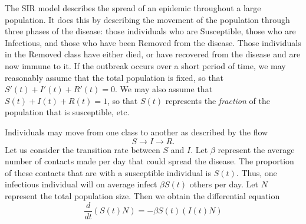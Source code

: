 %
%
%
%
%
%
%
%
The SIR model describes the spread of an epidemic throughout a large population.
It does this by describing the movement of the population through three phases of the disease: those individuals who are Susceptible, those who are Infectious, and those who have been Removed from the disease.
Those individuals in the Removed class have either died, or have recovered from the disease and are now immune to it.
If the outbreak occurs over a short period of time, we may reasonably assume that the total population is fixed, so that $S'(t) + I'(t) + R'(t) = 0$.
We may also assume that $S(t) + I(t) + R(t) = 1$, so that $S(t)$ represents the \textit{fraction} of the population that is susceptible, etc.

Individuals may move from one class to another as described by the flow
\[S \to I \to R.\]
Let us consider the transition rate between $S$ and $I $.
Let $\beta$ represent the average number of contacts made per day that could spread the disease.
The proportion of these contacts that are with a susceptible individual is $S(t)$.
Thus, one infectious individual will on average infect $\beta S(t)$ others per day.
Let $N$ represent the total population size.
Then we obtain the differential equation
\[\frac{d}{dt}(S(t) N) = -\beta S(t) (I(t) N)\]

